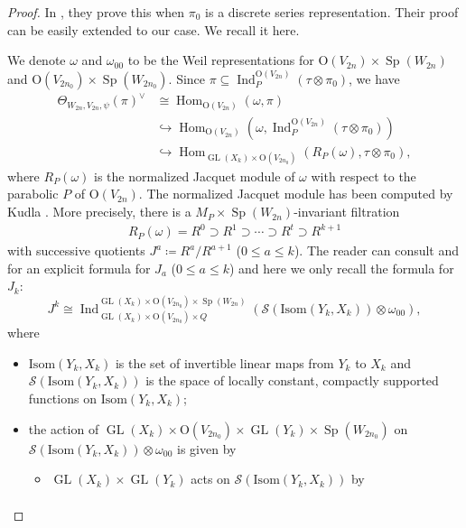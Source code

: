 \documentclass[article]{article}
\numberwithin{equation}{section}
\theoremstyle{definition}
\DeclareMathOperator{\Hom}{Hom}
\DeclareMathOperator{\Ind}{Ind}
\DeclareMathOperator{\GL}{GL}
\DeclareMathOperator{\SP}{Sp}
\begin{document}
\begin{proof}
	In \cite{MR3166215}, they prove this when $\pi_0$ is a discrete series representation. Their proof can be easily extended to our case. We recall it here. 
	
	We denote $\omega$ and $\omega_{00}$ to be the Weil representations for $\mathrm O(V_{2n})\times \SP(W_{2n})$ and $\mathrm O(V_{2n_0})\times \SP(W_{2n_0})$. Since $\pi\subseteq \Ind_{P}^{\mathrm O(V_{2n})}(\tau\otimes \pi_0)$, we have 
	\begin{align*}
	\Theta_{W_{2n},V_{2n},\psi}(\pi)^\vee &\cong \Hom_{\mathrm O(V_{2n})}(\omega, \pi)\\
	&\hookrightarrow \Hom_{\mathrm O(V_{2n})}(\omega, \Ind_{P}^{\mathrm O(V_{2n})}(\tau\otimes \pi_0))\\
	& \hookrightarrow \Hom_{\GL(X_k)\times \mathrm O(V_{2n_0})}(R_{P}(\omega), \tau\otimes \pi_0),
	\end{align*} 
	where $R_{P}(\omega)$ is the normalized Jacquet module of $\omega$ with respect to the parabolic $P$ of $\mathrm O(V_{2n})$. The normalized Jacquet module has been computed by Kudla \cite{MR818351}. More precisely, there is a $M_P\times \SP(W_{2n})$-invariant filtration 
	\begin{align*}
	R_{P}(\omega)= R^0 \supset R^1\supset \cdots \supset R^t \supset R^{k+1}
	\end{align*}
	with successive quotients $J^a\coloneqq R^a/R^{a+1}$ ($0\leq a\leq k$). The reader can consult \cite{MR818351} and \cite[Lemma 5.1]{MR3714507} for an explicit formula for $J_a$ ($0\leq a\leq k$) and here we only recall the formula for $J_k$:  
	$$J^k\cong \Ind_{\GL(X_k)\times \mathrm O(V_{2n_0})\times Q}^{\GL(X_k)\times \mathrm O(V_{2n_0})\times \SP(W_{2n})}(\mathscr S(\mathrm{Isom}(Y_k,X_k))\otimes \omega_{00}),$$
	where 
	\begin{itemize}
		\item $\mathrm{Isom}(Y_k,X_k)$ is the set of invertible linear maps from $Y_k$ to $X_k$ and $\mathscr S(\mathrm{Isom}(Y_k,X_k))$ is the space of locally constant, compactly supported functions on $\mathrm{Isom}(Y_k,X_k)$;
		\item the action of $\GL(X_k)\times \mathrm O(V_{2n_0})\times \GL(Y_k)\times \SP(W_{2n_0})$ on $\mathscr S(\mathrm{Isom}(Y_k,X_k))\otimes \omega_{00}$ is given by 
		\begin{itemize}
			\item $\GL(X_k)\times \GL(Y_k)$ acts on $\mathscr S(\mathrm{Isom}(Y_k,X_k))$ by 
			\begin{align*}

\end{align*}
\end{itemize}
\end{itemize}
\end{proof}
\end{document}
